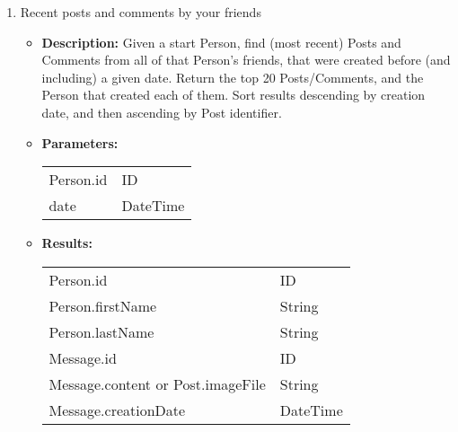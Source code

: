 {\begin{enumerate}
                \item Recent posts and comments by your friends
                    \begin{itemize}
                        \item \textbf{Description:}
                            Given a start Person, find (most recent) Posts and Comments from
                            all of that Person's friends, that were created before (and
                            including) a given date.  Return the top 20 Posts/Comments, and the
                            Person that created each of them.  Sort results descending by
                            creation date, and then ascending by Post identifier.			
                        \item \textbf{Parameters:} \\
                            \begin{tabular}{ll}
                                Person.id 										& ID \\
                                date 											& DateTime \\
                            \end{tabular}
                        \item \textbf{Results:} \\
                            \begin{tabular}{ll}
                                Person.id 										& ID \\
                                Person.firstName								& String \\
                                Person.lastName									& String \\
                                Message.id 								& ID \\
                                Message.content or Post.imageFile 	& String \\
                                Message.creationDate	& DateTime \\
                            \end{tabular}		
                    \end{itemize}


\end{enumerate}}

